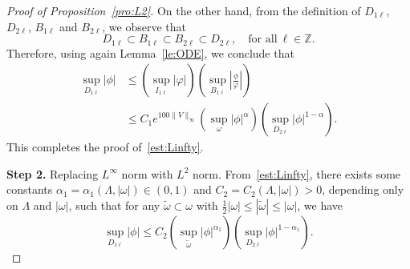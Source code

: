 \documentclass[a4paper,reqno]{amsart}
\theoremstyle{definition}
\numberwithin{equation}{section}
\begin{document}
\begin{proof}[Proof of Proposition~\ref{pro:L2}]
On the other hand, from the definition of $D_{1\ell}$, $D_{2\ell}$, $B_{1\ell}$ and $B_{2\ell}$, we observe that 
\begin{equation*}
D_{1\ell}\subset B_{1\ell}\subset B_{2\ell}\subset D_{2\ell},\quad \mbox{for all}\ \ell\in \mathbb{Z}.
\end{equation*}
Therefore, using again Lemma~\ref{le:ODE}, we conclude that 
\begin{equation*}
\begin{aligned}
\sup_{D_{1\ell}}|\phi|
&\le \left(\sup_{I_{1\ell}}\left|\varphi\right|\right) \left(\sup_{B_{1\ell}}\left|\frac{\phi}{\varphi}\right|\right)\\
&\le C_{1}e^{100\|V\|_{\infty}}\left(\sup_{\omega}\left|{\phi}\right|^{\alpha}\right)\left(\sup_{D_{2\ell}}\left|{\phi}\right|^{1-\alpha}\right).
\end{aligned}
\end{equation*} 
This completes the proof of~\eqref{est:Linfty}.

\smallskip
\textbf{Step 2.} Replacing $L^{\infty}$ norm with $L^{2}$ norm.
From~\eqref{est:Linfty}, there exists some constants $\alpha_{1}=\alpha_{1}(\Lambda,|\omega|)\in (0,1)$ and $C_{2}=C_{2}(\Lambda,|\omega|)>0$, depending only on $\Lambda$ and $|\omega|$, such that for any $\widetilde{\omega}\subset \omega$ with $  \frac{1}{2}|\omega|\le |\widetilde{\omega}|\le |\omega|$, we have 
\begin{equation}\label{est:Linfty2}
    \sup_{D_{1\ell}}|\phi|\le C_{2}\left(\sup_{\widetilde{\omega}}|\phi|^{\alpha_{1}}\right)\left(\sup_{D_{2\ell}}|\phi|^{1-\alpha_{1}}\right).
    \end{equation}


\end{proof}
\end{document}
